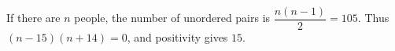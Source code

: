 If there are $n$ people, the number of unordered pairs is $\dfrac{n(n-1)}{2}=105$. Thus $(n-15)(n+14)=0$, and positivity gives $\boxed{15}$.
